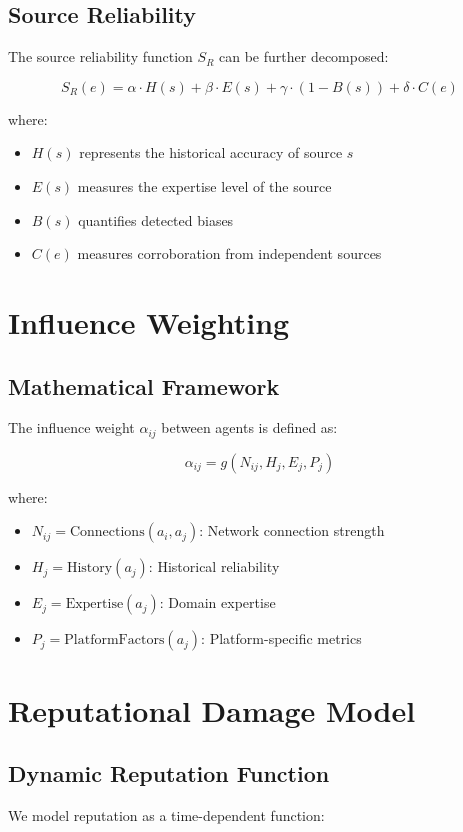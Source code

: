 \documentclass[12pt, a4paper]{article}
\begin{document}
\subsection{Source Reliability}
The source reliability function $S_R$ can be further decomposed:

\begin{equation}
S_R(e) = \alpha \cdot H(s) + \beta \cdot E(s) + \gamma \cdot (1 - B(s)) + \delta \cdot C(e)
\end{equation}

where:
\begin{itemize}
\item $H(s)$ represents the historical accuracy of source $s$
\item $E(s)$ measures the expertise level of the source
\item $B(s)$ quantifies detected biases
\item $C(e)$ measures corroboration from independent sources
\end{itemize}

\section{Influence Weighting}
\subsection{Mathematical Framework}
The influence weight $\alpha_{ij}$ between agents is defined as:

\begin{equation}
\alpha_{ij} = g(N_{ij}, H_j, E_j, P_j)
\end{equation}

where:
\begin{itemize}
\item $N_{ij} = \text{Connections}(a_i, a_j)$: Network connection strength
\item $H_j = \text{History}(a_j)$: Historical reliability
\item $E_j = \text{Expertise}(a_j)$: Domain expertise
\item $P_j = \text{PlatformFactors}(a_j)$: Platform-specific metrics
\end{itemize}

\section{Reputational Damage Model}
\subsection{Dynamic Reputation Function}
We model reputation as a time-dependent function:
\end{document}
